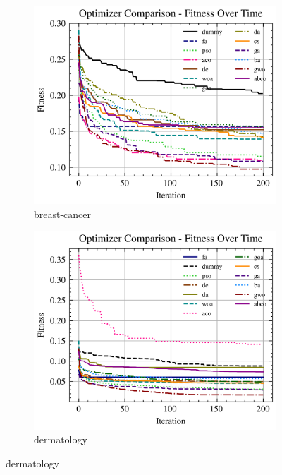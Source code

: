 \begin{figure}[htp]
    \centering
    \begin{subfigure}[htp]{0.45\textwidth}
        \includegraphics[width=\textwidth]{imagenes/fitness_charts/img/binary/breast-cancer/optimizers_fitness_knn.png}
        \caption{breast-cancer}
    \end{subfigure}
    \begin{subfigure}[htp]{0.45\textwidth}
        \includegraphics[width=\textwidth]{imagenes/fitness_charts/img/binary/dermatology/optimizers_fitness_knn.png}
        \caption{dermatology}
    \end{subfigure}


\end{figure}
